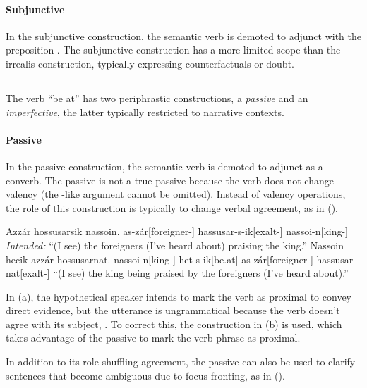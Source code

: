 \paragraph{Subjunctive}
In the subjunctive construction, the semantic verb is demoted to adjunct with the preposition . The subjunctive construction has a more limited scope than the  irrealis construction, typically expressing counterfactuals or doubt.

\subsection{}
The verb  “be at” has two periphrastic constructions, a \emph{passive} and an \emph{imperfective}, the latter typically restricted to narrative contexts.

\paragraph{Passive}
In the passive construction, the semantic verb is demoted to adjunct as a converb. The  passive is not a true passive because the verb does not change valency (\ie the -like argument cannot be omitted). Instead of valency operations, the role of this construction is typically to change verbal agreement, as in (\nextx).

\begin{gloss*}
	\a \ljudge{*} \begingl
		\glpreamble Azzár hossusarsik nassoin.\endpreamble 
			as-zár[foreigner-]
			hassusar-s-ik[exalt-]
			nassoi-n[king-]
		\glft \textit{Intended:} “(I see) the foreigners (I've heard about) praising the king.”
	\endgl
	\a \begingl
		\glpreamble Nassoin hecik azzár hossusarnat.\endpreamble
			nassoi-n[king-]
			het-s-ik[be.at]
			as-zár[foreigner-]
			hassusar-nat[exalt-]
		\glft “(I see) the king being praised by the foreigners (I've heard about).”
	\endgl
\end{gloss*}

In (\lastx a), the hypothetical speaker intends to mark the verb as proximal to convey direct evidence, but the utterance is ungrammatical because the verb doesn't agree with its subject, . To correct this, the construction in (\lastx b) is used, which takes advantage of the passive to mark the verb phrase as proximal.

\par In addition to its role shuffling agreement, the  passive can also be used to clarify sentences that become ambiguous due to focus fronting, as in (\nextx).

